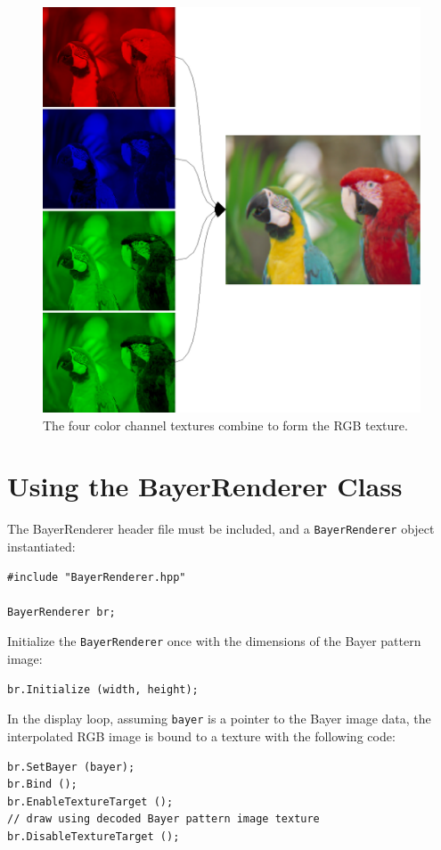 \documentclass[11pt,letterpaper]{article}
\begin{document}
\begin{figure}
\centering
\includegraphics{interpolation}
\caption{The four color channel textures combine to form the RGB texture.}
\label{fig:interpolation}
\end{figure}
\section{Using the BayerRenderer Class}

The BayerRenderer header file must be included, and a
\texttt{BayerRenderer} object instantiated:
\begin{verbatim}
#include "BayerRenderer.hpp"

BayerRenderer br;
\end{verbatim}

Initialize the \texttt{BayerRenderer} once with the dimensions of the
Bayer pattern image:
\begin{verbatim}
br.Initialize (width, height);
\end{verbatim}

In the display loop, assuming \texttt{bayer} is a pointer to the Bayer
image data, the interpolated RGB image is bound to a texture with the
following code:
\begin{verbatim}
br.SetBayer (bayer);
br.Bind ();
br.EnableTextureTarget ();
// draw using decoded Bayer pattern image texture
br.DisableTextureTarget ();
\end{verbatim}
\end{document}
